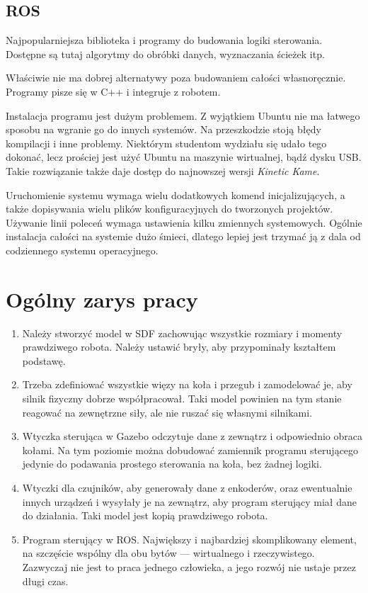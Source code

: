 \subsection{ROS}
Najpopularniejsza biblioteka i programy do budowania logiki sterowania.
Dostępne są tutaj algorytmy do obróbki danych, wyznaczania ścieżek itp.

Właściwie nie ma dobrej alternatywy poza budowaniem całości własnoręcznie.
Programy pisze się w C++ i integruje z robotem.

Instalacja programu jest dużym problemem.
Z wyjątkiem Ubuntu nie ma łatwego sposobu na wgranie go do innych systemów.
Na przeszkodzie stoją błędy kompilacji i inne problemy. Niektórym studentom wydziału się udało tego dokonać, lecz prościej jest użyć Ubuntu na maszynie wirtualnej, bądź dysku USB.
Takie rozwiązanie także daje dostęp do najnowszej wersji \emph{Kinetic Kame}.

Uruchomienie systemu wymaga wielu dodatkowych komend inicjalizujących, a także dopisywania wielu plików konfiguracyjnych do tworzonych projektów.
Używanie linii poleceń wymaga ustawienia kilku zmiennych systemowych.
Ogólnie instalacja całości na systemie dużo śmieci, dlatego lepiej jest trzymać ją z dala od codziennego systemu operacyjnego.

\section{Ogólny zarys pracy}
\begin{enumerate}
 \item Należy stworzyć model w SDF zachowując wszystkie rozmiary i momenty prawdziwego robota.
Należy ustawić bryły, aby przypominały kształtem podstawę.

\item Trzeba zdefiniować wszystkie więzy na koła i przegub i zamodelować je, aby silnik fizyczny dobrze współpracował.
Taki model powinien na tym stanie reagować na zewnętrzne siły, ale nie ruszać się własnymi silnikami.

\item Wtyczka sterująca w Gazebo odczytuje dane z zewnątrz i odpowiednio obraca kołami.
Na tym poziomie można dobudować zamiennik programu sterującego jedynie do podawania prostego sterowania na koła, bez żadnej logiki.

\item Wtyczki dla czujników, aby generowały dane z enkoderów, oraz ewentualnie innych urządzeń i wysyłały je na zewnątrz, aby program sterujący miał dane do działania.
Taki model jest kopią prawdziwego robota.

\item Program sterujący w ROS. Największy i najbardziej skomplikowany element, na szczęście wspólny dla obu bytów --- wirtualnego i rzeczywistego.
Zazwyczaj nie jest to praca jednego człowieka, a jego rozwój nie ustaje przez długi czas.

\end{enumerate}

